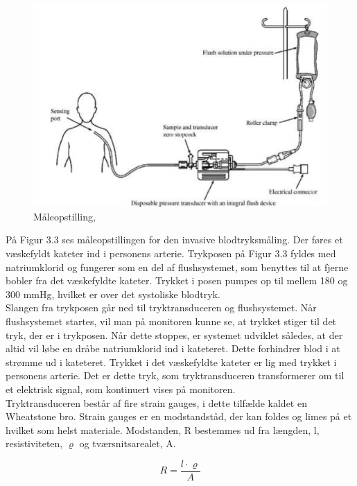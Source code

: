 \begin{figure}[H]
	\centering
	\includegraphics[width=1\textwidth]{Figurer/Snip20151207_50}
	\caption{Måleopstilling, \protect\cite[s. 296]{Billed for invasiv blodtryksmaling}}
\end{figure}

På Figur 3.3 ses måleopstillingen for den invasive blodtryksmåling. Der føres et væskefyldt kateter ind i personens arterie. Trykposen på Figur 3.3 fyldes med natriumklorid og fungerer som en del af flushsystemet, som benyttes til at fjerne bobler fra det væskefyldte kateter. Trykket i posen pumpes op til mellem 180 og 300 mmHg, hvilket er over det systoliske blodtryk. \\
Slangen fra trykposen går ned til tryktransduceren og flushsystemet. Når flushsystemet startes, vil man på monitoren kunne se, at trykket stiger til det tryk, der er i trykposen. Når dette stoppes, er systemet udviklet således, at der altid vil løbe en dråbe natriumklorid ind i kateteret. Dette forhindrer blod i at strømme ud i kateteret. Trykket i det væskefyldte kateter er lig med trykket i personens arterie. Det er dette tryk, som tryktransduceren transformerer om til et elektrisk signal, som kontinuert vises på monitoren. \\
Tryktransduceren består af fire strain gauges, i dette tilfælde kaldet en Wheatstone bro. Strain gauges er en modstandståd, der kan foldes og limes på et hvilket som helst materiale. Modstanden, R bestemmes ud fra længden, l, resistiviteten, $\varrho$ og tværsnitsarealet, A. 

\begin{equation}
	R = \frac{l \cdot \varrho}{A}
\end{equation}

